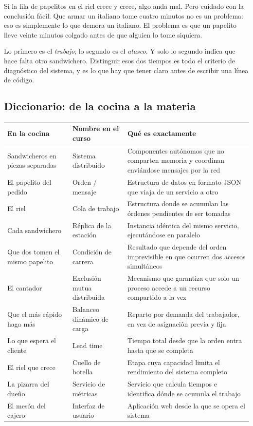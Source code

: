 \documentclass[11pt,a4paper]{article}
\begin{document}
Si la fila de papelitos en el riel crece y crece, algo anda mal. Pero cuidado con la conclusión fácil. Que armar un italiano tome cuatro minutos no es un problema: eso es simplemente lo que demora un italiano. El problema es que un papelito lleve veinte minutos colgado antes de que alguien lo tome siquiera.

Lo primero es el \emph{trabajo}; lo segundo es el \emph{atasco}. Y solo lo segundo indica que hace falta otro sandwichero. Distinguir esos dos tiempos es todo el criterio de diagnóstico del sistema, y es lo que hay que tener claro antes de escribir una línea de código.

\subsection{Diccionario: de la cocina a la materia}

\vspace{-3pt}
\begin{table}[H]
\centering\footnotesize
\begin{tabular}{@{}L{3.5cm} L{3.6cm} L{8.1cm}@{}}
\toprule
\textbf{En la cocina} & \textbf{Nombre en el curso} & \textbf{Qué es exactamente} \\
\midrule
Sandwicheros en piezas separadas & Sistema distribuido & Componentes autónomos que no comparten memoria y coordinan enviándose mensajes por la red \\
El papelito del pedido & Orden / mensaje & Estructura de datos en formato JSON que viaja de un servicio a otro \\
El riel & Cola de trabajo & Estructura donde se acumulan las órdenes pendientes de ser tomadas \\
Cada sandwichero & Réplica de la estación & Instancia idéntica del mismo servicio, ejecutándose en paralelo \\
Que dos tomen el mismo papelito & Condición de carrera & Resultado que depende del orden imprevisible en que ocurren dos accesos simultáneos \\
El cantador & Exclusión mutua distribuida & Mecanismo que garantiza que solo un proceso accede a un recurso compartido a la vez \\
Que el más rápido haga más & Balanceo dinámico de carga & Reparto por demanda del trabajador, en vez de asignación previa y fija \\
Lo que espera el cliente & Lead time & Tiempo total desde que la orden entra hasta que se completa \\
El riel que crece & Cuello de botella & Etapa cuya capacidad limita el rendimiento del sistema completo \\
La pizarra del dueño & Servicio de métricas & Servicio que calcula tiempos e identifica dónde se acumula el trabajo \\
El mesón del cajero & Interfaz de usuario & Aplicación web desde la que se opera el sistema \\
\bottomrule
\end{tabular}
\end{table}
\end{document}
